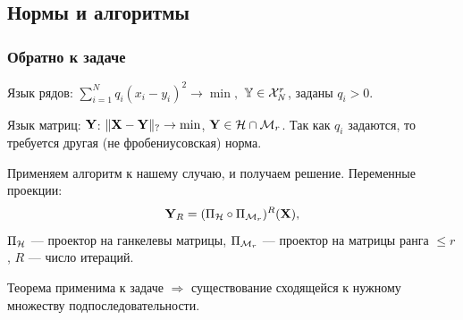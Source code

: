 \documentclass[unicode, notheorems]{beamer}
\begin{document}
%	
%	
%	
%	
%	
%	
%	

\subsection{Нормы и алгоритмы}
\begin{frame}
	\frametitle{Обратно к задаче}
	Язык рядов: $\sum \limits_{i=1}^N q_i(x_i - y_i)^2 \to \min,$ $\mathbb{Y} \in \mathcal{X}_N^r$, заданы $q_i > 0$.
	
	Язык матриц: $\mathbf{Y}$: $\|\mathbf{X} - \mathbf{Y}\|_? \to \min$, $\mathbf{Y} \in \mathcal{H} \cap \mathcal{M}_r$. Так как $q_i$ задаются, то требуется другая (не фробениусовская)  норма.
	
	\vspace{0.3cm}
	Применяем алгоритм к нашему случаю, и получаем решение. Переменные проекции: 
	\begin{equation*}
	\mathbf{Y}_R = (\Pi_{\mathcal{H}} \circ \Pi_{\mathcal{M}_r})^R (\mathbf{X}),
	\end{equation*}
	$\Pi_{\mathcal{H}}$ --- проектор на ганкелевы матрицы, $\Pi_{\mathcal{M}_r}$ --- проектор на матрицы ранга $\le r$, $R$ --- число итераций.
	
	Теорема применима к задаче $\Rightarrow$ существование сходящейся к нужному множеству подпоследовательности.
\end{frame}
\end{document}
